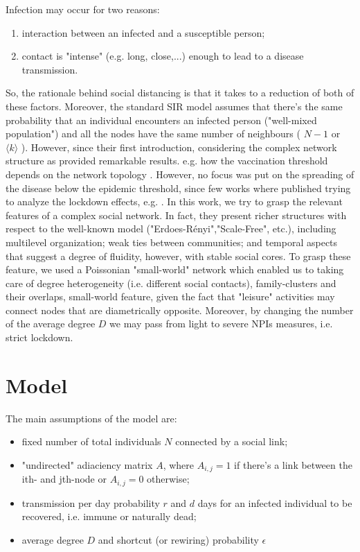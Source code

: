 \documentclass[a4paper,11pt,twoside]{report} %
\begin{document}
Infection may occur for two reasons:
\begin{enumerate}
    \item interaction between an infected and a susceptible person;
    \item contact is "intense" (e.g. long, close,...) enough to lead to a disease transmission.
\end{enumerate}
So, the rationale behind social distancing is that it takes to a reduction of both of these factors.
Moreover, the standard SIR model assumes that there's the same probability that an individual encounters an infected person ("well-mixed population") and all the nodes have the same number of neighbours ( $N-1$ or $\langle k\rangle$ ). However, since their first introduction, considering the complex network structure as provided remarkable results. e.g. how the vaccination threshold depends on the network topology \cite{SVespignani-EpSpreadSFNets}. However, no focus was put on the spreading of the disease below the epidemic threshold, since few works where published trying to analyze the lockdown effects, e.g. \cite{Ferguson-CapturingHumanBehaviour}. In this work, we try to grasp the relevant features of a complex social network. In fact, they present richer structures with respect to the well-known model ("Erdoes-Rényi","Scale-Free", etc.), including multilevel organization; weak ties between communities; and temporal aspects that suggest a degree of fluidity, however, with stable social cores.
To grasp these feature, we used a Poissonian "small-world" network which enabled us to taking care of degree heterogeneity (i.e. different social contacts), family-clusters and their overlaps, small-world feature, given the fact that "leisure" activities may connect nodes that are diametrically opposite. Moreover, by changing the number of the average degree $D$ we may pass from light to severe NPIs measures, i.e. strict lockdown.

\chapter[Model]{Model}


The main assumptions of the model are:
\begin{itemize}
    \item fixed number of total individuals $N$ connected by a social link;
    \item "undirected" adiaciency matrix $A$, where $A_{i,j}=1$ if there's a link between the ith- and jth-node or $A_{i,j}=0$ otherwise;
    \item transmission per day probability $r$ and $d$ days for an infected individual to be recovered, i.e. immune or naturally dead;
    \item average degree $D$ and shortcut (or rewiring) probability $\epsilon$
\end{itemize}
\end{document}
